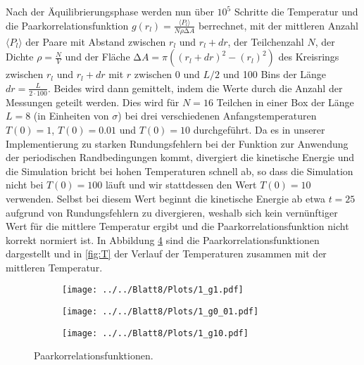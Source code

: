 Nach der Äquilibrierungsphase werden nun über $10^{5}$ Schritte die Temperatur und die Paarkorrelationsfunktion
$g(r_l)=\frac{\langle P_l \rangle}{N\rho\increment A}$ berrechnet, mit der mittleren Anzahl $\langle P_l \rangle$ der Paare mit Abstand zwischen $r_l$ und $r_l+dr$, der Teilchenzahl $N$, der Dichte $\rho=\frac{N}{V}$ und der Fläche $\increment A=\pi((r_l+dr)^2-(r_l)^2)$ des Kreisrings zwischen
$r_l$ und $r_l+dr$ mit $r$ zwischen 0 und $L/2$ und 100 Bins der Länge $dr=\frac{L}{2\cdot100}$.
Beides wird dann gemittelt, indem die Werte durch die Anzahl der Messungen geteilt werden. Dies wird für $N=16$ Teilchen in einer
Box der Länge $L=8$ (in Einheiten von $\sigma$) bei drei verschiedenen Anfangstemperaturen $T(0)=1$, $T(0)=0.01$ und
$T(0)=10$ durchgeführt. Da es in unserer Implementierung zu starken Rundungsfehlern bei der Funktion zur Anwendung der periodischen Randbedingungen
kommt, divergiert die kinetische Energie und die Simulation bricht bei hohen Temperaturen schnell
ab, so dass die Simulation nicht bei $T(0)=100$ läuft und wir stattdessen den Wert $T(0)=10$ verwenden. Selbst bei diesem Wert beginnt die kinetische Energie ab etwa $t=25$ aufgrund von Rundungsfehlern zu divergieren, weshalb sich kein vernünftiger Wert für die mittlere Temperatur ergibt und die Paarkorrelationsfunktion nicht korrekt normiert ist.
In Abbildung \ref{fig:G} sind die Paarkorrelationsfunktionen dargestellt und in \ref{fig:T} der Verlauf der Temperaturen zusammen mit der mittleren Temperatur.
\begin{figure}[H]
\begin{subfigure}[c]{0.5\textwidth}
\texttt{[image: ../../Blatt8/Plots/1\_g1.pdf]}
\label{fig:g_1}
\end{subfigure}
\begin{subfigure}[c]{0.5\textwidth}
\texttt{[image: ../../Blatt8/Plots/1\_g0\_01.pdf]}
\label{fig:g_0_01}
\end{subfigure}
\begin{subfigure}[c]{0.5\textwidth}
\texttt{[image: ../../Blatt8/Plots/1\_g10.pdf]}
\label{fig:g_10}
\end{subfigure}
\caption{Paarkorrelationsfunktionen.}
\label{fig:G}
\end{figure}

